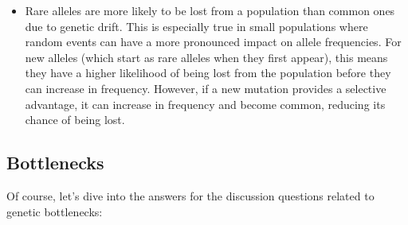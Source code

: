 \documentclass[
  a4paper]{book}
\providecommand{\tightlist}{%
  \setlength{\itemsep}{0pt}\setlength{\parskip}{0pt}}
\begin{document}
\begin{enumerate}
  \begin{itemize}
  \tightlist
  \item
    Rare alleles are more likely to be lost from a population than common ones due to genetic drift. This is especially true in small populations where random events can have a more pronounced impact on allele frequencies. For new alleles (which start as rare alleles when they first appear), this means they have a higher likelihood of being lost from the population before they can increase in frequency. However, if a new mutation provides a selective advantage, it can increase in frequency and become common, reducing its chance of being lost.
  \end{itemize}
\end{enumerate}

\subsection{Bottlenecks}\label{bottlenecks-1}

Of course, let's dive into the answers for the discussion questions related to genetic bottlenecks:
\end{document}
